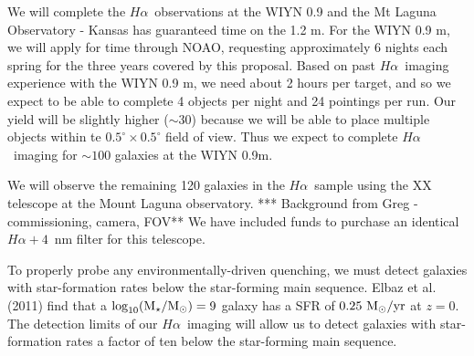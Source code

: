 \documentclass[12pt, preprint]{aastex}
\newcommand{\ha}{$H\alpha$}
\begin{document}
We will complete the \ha \ observations at the WIYN 0.9 and the Mt
Laguna Observatory - Kansas has guaranteed time on the 1.2 m.
For the WIYN 0.9 m, we will apply for time through NOAO, requesting
approximately 6 nights each spring for the three years covered by this
proposal.  Based on past \ha \ imaging experience with the WIYN 0.9 m,
we need about 2 hours per target, and so we expect to be able to
complete 4 objects per night and 24 pointings per run.  Our yield will
be slightly higher ($\sim 30$) because we will be able to place multiple objects within
te $0.5^\circ \times 0.5^\circ$ field of view.  Thus we expect to
complete \ha \ imaging for
$\sim 100$ galaxies at the WIYN 0.9m. 

We will observe the remaining 120 galaxies in the \ha \ sample using the
XX telescope at the Mount Laguna observatory.  
*** Background from Greg - commissioning, camera, FOV**
We have included funds to purchase an identical 
$H\alpha+4$~nm filter for this telescope.  


To properly probe any environmentally-driven quenching, we must detect galaxies
with star-formation rates below the star-forming main sequence. Elbaz et al. (2011) find that a
$\rm \log_{10}(M_\star/M_\odot) = 9$ galaxy has a SFR 
of $\rm 0.25~ M_\odot/yr$ at $z = 0$. 
The detection limits of our \ha \ imaging will allow us to detect galaxies with star-formation rates a
factor of ten below the star-forming main sequence.

\end{document}
